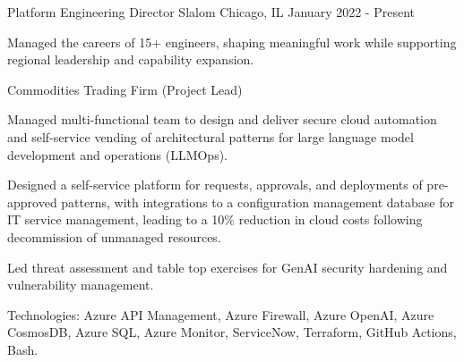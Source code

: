 

\begin{cventries}

  \cventry
    {Platform Engineering Director} %
    {Slalom} %
    {Chicago, IL} %
    {January 2022 - Present} %
    {
      \begin{cvitems} %
        \item {Managed the careers of 15+ engineers, shaping meaningful work while supporting regional leadership and capability expansion.}
      \end{cvitems}
    }

  \cventry
    {Commodities Trading Firm (Project Lead)} %
    {} %
    {} %
    {} %
    {
      \begin{cvitems} %
        \item {Managed multi-functional team to design and deliver secure cloud automation and self-service vending of architectural patterns for large language model development and operations (LLMOps).}
        \item {Designed a self-service platform for requests, approvals, and deployments of pre-approved patterns, with integrations to a configuration management database for IT service management, leading to a 10\% reduction in cloud costs following decommission of unmanaged resources.}
        \item {Led threat assessment and table top exercises for GenAI security hardening and vulnerability management.}
        \item {Technologies: Azure API Management, Azure Firewall, Azure OpenAI, Azure CosmosDB, Azure SQL, Azure Monitor, ServiceNow, Terraform, GitHub Actions, Bash.}
      \end{cvitems}
    }


\end{cventries}
